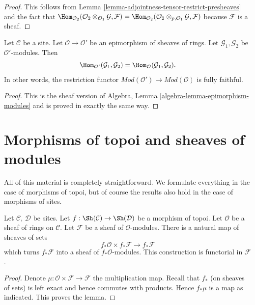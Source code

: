 \begin{proof}
This follows from
Lemma \ref{lemma-adjointness-tensor-restrict-presheaves}
and the fact that
$\Hom_{\mathcal{O}_2}(
\mathcal{O}_2 \otimes_{\mathcal{O}_1} \mathcal{G},
\mathcal{F}
)
=
\Hom_{\mathcal{O}_2}(
\mathcal{O}_2 \otimes_{p, \mathcal{O}_1} \mathcal{G},
\mathcal{F}
)$
because $\mathcal{F}$ is a sheaf.
\end{proof}

\begin{lemma}
\label{lemma-epimorphism-modules}
Let $\mathcal{C}$ be a site.
Let $\mathcal{O} \to \mathcal{O}'$ be an epimorphism of sheaves of rings.
Let $\mathcal{G}_1, \mathcal{G}_2$ be $\mathcal{O}'$-modules.
Then
$$
\Hom_{\mathcal{O}'}(\mathcal{G}_1, \mathcal{G}_2) =
\Hom_\mathcal{O}(\mathcal{G}_1, \mathcal{G}_2).
$$
In other words, the restriction functor
$\textit{Mod}(\mathcal{O}') \to \textit{Mod}(\mathcal{O})$ is fully faithful.
\end{lemma}

\begin{proof}
This is the sheaf version of
Algebra, Lemma \ref{algebra-lemma-epimorphism-modules}
and is proved in exactly the same way.
\end{proof}




\section{Morphisms of topoi and sheaves of modules}
\label{section-sheaves-modules-functorial}

\noindent
All of this material is completely straightforward.
We formulate everything in the case of morphisms of topoi,
but of course the results also hold in the case of morphisms of sites.

\begin{lemma}
\label{lemma-pushforward-module}
Let $\mathcal{C}$, $\mathcal{D}$ be sites.
Let $f : \Sh(\mathcal{C}) \to \Sh(\mathcal{D})$
be a morphism of topoi.
Let $\mathcal{O}$ be a sheaf of rings on $\mathcal{C}$.
Let $\mathcal{F}$ be a sheaf of $\mathcal{O}$-modules.
There is a natural map of sheaves of sets
$$
f_*\mathcal{O} \times f_*\mathcal{F}
\longrightarrow
f_*\mathcal{F}
$$
which turns $f_*\mathcal{F}$ into a sheaf of $f_*\mathcal{O}$-modules.
This construction is functorial in $\mathcal{F}$.
\end{lemma}

\begin{proof}
Denote $\mu : \mathcal{O} \times \mathcal{F} \to \mathcal{F}$ the
multiplication map. Recall that $f_*$ (on sheaves of sets) is left exact
and hence commutes with products. Hence $f_*\mu$ is a map as
indicated. This proves the lemma.
\end{proof}

